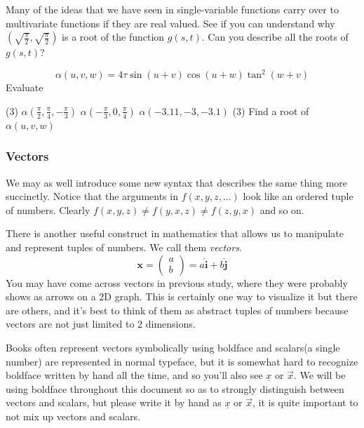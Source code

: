 \documentclass[14pt]{article}
\begin{document}
	Many of the ideas that we have seen in single-variable functions carry over to multivariate functions if they are real valued. See if you can understand why $\left( \sqrt{\frac{\pi}{2}}, \sqrt{\frac{\pi}{2}}\right) $ is a root of the function $g(s, t)$. Can you describe all the roots of $g(s, t)$?
	
	\begin{question}[unbreakable]{}{}
		\begin{equation*}
			\alpha(u, v, w) = 4\tau \sin(u+v)\cos(u+w)\tan^2(w+v)
		\end{equation*}
	Evaluate 
	\begin{tasks}(3)
		\task $\alpha\left( \frac{\pi}{2}, \frac{\pi}{4}, -\frac{\pi}{3}\right)$
		\task $\alpha\left(-\frac{\pi}{3},             0,  \frac{\pi}{4}\right)$
		\task $\alpha\left( -3.11, -3, -3.1\right)$
		\task*(3) Find a root of $\alpha(u, v, w)$
	\end{tasks}
	\end{question}
	
	\subsubsection{Vectors} 
	We may as well introduce some new syntax that describes the same thing more succinctly. Notice that the arguments in $f(x, y, z, ...)$ look like an ordered tuple of numbers. Clearly $f(x, y, z) \neq f(y, x, z) \neq f(z, y, x)$ and so on. 
	
	There is another useful construct in mathematics that allows us to manipulate and represent tuples of numbers. We call them \textit{vectors}. 
	\begin{equation*}
		\mathbf{x} = \begin{pmatrix}
			a \\
			b 
		\end{pmatrix} = a \hat{\mathbf{i}} + b \hat{\mathbf{j}}
	\end{equation*}
	You may have come across vectors in previous study, where they were probably shows as arrows on a 2D graph. This is certainly one way to visualize it but there are others, and it's best to think of them as abstract tuples of numbers because vectors are not just limited to 2 dimensions.
	
	Books often represent vectors symbolically using boldface and scalars(a single number) are represented in normal typeface, but it is somewhat hard to recognize boldface written by hand all the time, and so you'll also see $\underline{x}$ or $\vec{x}$. We will be using boldface throughout this document so as to strongly distinguish between vectors and scalars, but please write it by hand as $\underline{x}$ or $\vec{x}$, it is quite important to not mix up vectors and scalars.
	
\end{document}
